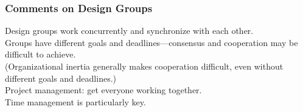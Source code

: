 \begin{frame}

\frametitle{Comments on Design Groups}
\begin{changemargin}{2.5cm}
Design groups work concurrently and synchronize with each other.\\[1em]

Groups have different goals and deadlines---consensus and
cooperation may be difficult to achieve. \\[1em]

(Organizational inertia generally makes cooperation difficult, even
without different goals and deadlines.)\\[1em]

Project management: get everyone working together.\\[1em]

Time management is particularly key.
\end{changemargin}
\end{frame}


